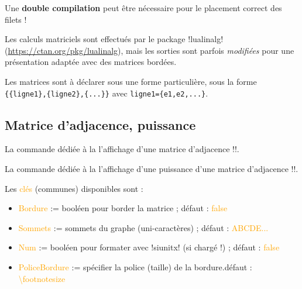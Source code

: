 \documentclass[french,a4paper,11pt]{article}
\newcommand\Cle[1]{{\small\sffamily\textlangle \textcolor{orange}{#1}\textrangle}}
\begin{document}
{{\begin{warningblock}
\smallskip

Une \textbf{double compilation} peut être nécessaire pour le placement correct des filets !

\smallskip

Les calculs matriciels sont effectués par le package \packagetex!lualinalg! (\url{https://ctan.org/pkg/lualinalg}), mais les sorties sont parfois \textit{modifiées} pour une présentation adaptée avec des matrices bordées.

\smallskip

Les matrices sont à déclarer sous une forme particulière, sous la forme \verb|{{ligne1},{ligne2},{...}}| avec \verb|ligne1={e1,e2,...}|.
\end{warningblock}

\subsection{Matrice d'adjacence, puissance}

\begin{cautionblock}
La commande dédiée à la l'affichage d'une matrice d'adjacence \motcletex!\MatriceAdjacence!.

\smallskip

La commande dédiée à la l'affichage d'une puissance d'une matrice d'adjacence \motcletex!\PuissanceMatrice!.
\end{cautionblock}

\begin{DemoCode}

\end{DemoCode}

\begin{tipblock}
Les \Cle{clés} (communes) disponibles sont :

\begin{itemize}
	\item \Cle{Bordure} := booléen pour border la matrice ; \hfill{}défaut : \Cle{false}
	\item \Cle{Sommets} := sommets du graphe (uni-caractères) ; \hfill{}défaut : \Cle{ABCDE...}
	\item \Cle{Num} := booléen pour formater avec \packagetex!siunitx! (si chargé !) ; \hfill{}défaut : \Cle{false}
	\item \Cle{PoliceBordure} := spécifier la police (taille) de la bordure.\hfill{}défaut : \Cle{\textbackslash footnotesize}
\end{itemize}


\end{tipblock}}}
\end{document}
